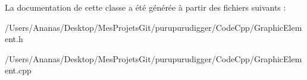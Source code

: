La documentation de cette classe a été générée à partir des fichiers suivants \-:\begin{DoxyCompactItemize}
\item 
/\-Users/\-Ananas/\-Desktop/\-Mes\-Projets\-Git/purupurudigger/\-Code\-Cpp/Graphic\-Element.\-h\item 
/\-Users/\-Ananas/\-Desktop/\-Mes\-Projets\-Git/purupurudigger/\-Code\-Cpp/Graphic\-Element.\-cpp\end{DoxyCompactItemize}
